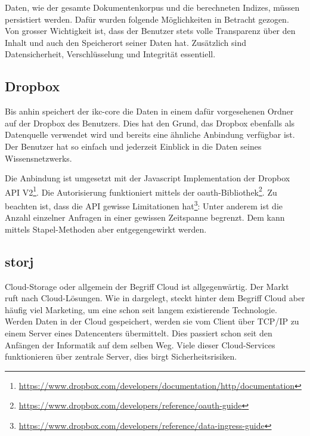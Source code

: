 
Daten, wie der gesamte Dokumentenkorpus und die berechneten Indizes, müs\-sen persistiert werden. Dafür wurden folgende Mö\-glich\-kei\-ten in Betracht gezogen. Von grosser Wichtigkeit ist, dass der Benutzer stets volle Transparenz über den Inhalt und auch den Speicherort seiner Daten hat. Zusätzlich sind Datensicherheit, Verschlüsselung und Integrität essentiell.


\subsection{Dropbox}


Bis anhin speichert der \gls{ikc-core} die Daten in einem dafür vorgesehenen Ordner auf der Dropbox des Benutzers. Dies hat den Grund, das Dropbox ebenfalls als Datenquelle verwendet wird und bereits eine ähnliche Anbindung verfügbar ist. Der Benutzer hat so einfach und jederzeit Einblick in die Daten seines Wissensnetzwerks.

Die Anbindung ist umgesetzt mit der Javascript Implementation der Dropbox API V2\footnote{\url{https://www.dropbox.com/developers/documentation/http/documentation}}. Die Autorisierung funktioniert mittels der oauth-Bibliothek\footnote{\url{https://www.dropbox.com/developers/reference/oauth-guide}}. Zu beachten ist, dass die API gewisse Limitationen hat\footnote{\url{https://www.dropbox.com/developers/reference/data-ingress-guide}}: Unter anderem ist die Anzahl einzelner Anfragen in einer gewissen Zeitspanne begrenzt. Dem kann mittels Stapel-Methoden aber entgegengewirkt werden.


\subsection{storj}

Cloud-Storage oder allgemein der Begriff Cloud ist allgegenwärtig. Der Markt ruft nach Cloud-Lösungen. Wie in \cite[S.~1-3]{wilkinson2014metadisk} dargelegt, steckt hinter dem Begriff Cloud aber häufig viel Marketing, um eine schon seit langem existierende Technologie. Werden Daten in der Cloud gespeichert, werden sie vom Client über TCP/IP zu einem Server eines Datencenters übermittelt. Dies passiert schon seit den Anfängen der Informatik auf dem selben Weg. Viele dieser Cloud-Services funktionieren über zentrale Server, dies birgt Sicherheitsrisiken.

